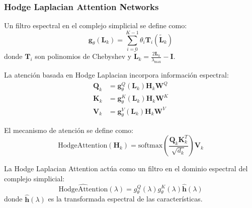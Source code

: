 \subsubsection{Hodge Laplacian Attention Networks}

\begin{definition}\label{def:filtro_espectral_hodge}
Un filtro espectral en el complejo simplicial se define como:
\begin{equation}
    \mathbf{g}_{\theta}(\mathbf{L}_k) = \sum_{i=0}^{K-1} \theta_i \mathbf{T}_i(\tilde{\mathbf{L}}_k)
\end{equation}
donde $\mathbf{T}_i$ son polinomios de Chebyshev y $\tilde{\mathbf{L}}_k = \frac{2\mathbf{L}_k}{\lambda_{\max}} - \mathbf{I}$.
\end{definition}

\begin{definition}\label{def:hodge_laplacian_attention}
La atención basada en Hodge Laplacian incorpora información espectral:
\begin{align}
    \mathbf{Q}_k &= \mathbf{g}_{\theta}^Q(\mathbf{L}_k) \mathbf{H}_k \mathbf{W}^Q \\
    \mathbf{K}_k &= \mathbf{g}_{\theta}^K(\mathbf{L}_k) \mathbf{H}_k \mathbf{W}^K \\
    \mathbf{V}_k &= \mathbf{g}_{\theta}^V(\mathbf{L}_k) \mathbf{H}_k \mathbf{W}^V
\end{align}

El mecanismo de atención se define como:
\begin{equation}
    \text{HodgeAttention}(\mathbf{H}_k) = \text{softmax}\left(\frac{\mathbf{Q}_k \mathbf{K}_k^T}{\sqrt{d_k}}\right) \mathbf{V}_k
\end{equation}
\end{definition}

\begin{theorem}\label{thm:interpretacion_frecuencial_hodge}
La Hodge Laplacian Attention actúa como un filtro en el dominio espectral del complejo simplicial:
\begin{equation}
    \widehat{\text{HodgeAttention}}(\lambda) = g_{\theta}^Q(\lambda) g_{\theta}^K(\lambda) \hat{\mathbf{h}}(\lambda)
\end{equation}
donde $\hat{\mathbf{h}}(\lambda)$ es la transformada espectral de las características.
\end{theorem}

